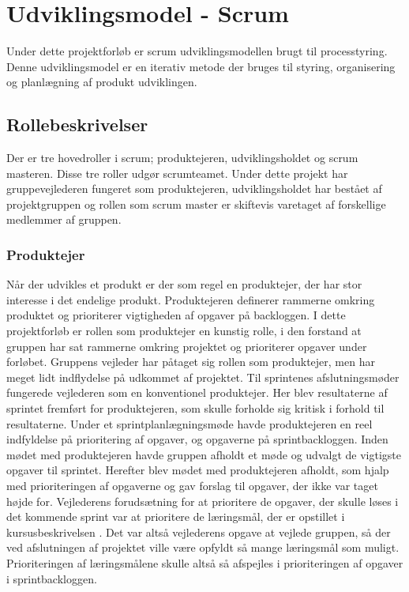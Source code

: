 \chapter{Udviklingsmodel - Scrum}
Under dette projektforløb er scrum udviklingsmodellen brugt til processtyring. Denne udviklingsmodel er en iterativ metode der bruges til styring, organisering og planlægning af produkt udviklingen.


\section{Rollebeskrivelser}
Der er tre hovedroller i scrum; produktejeren, udviklingsholdet og scrum masteren. Disse tre roller udgør scrumteamet. Under dette projekt har gruppevejlederen fungeret som produktejeren, udviklingsholdet har bestået af projektgruppen og rollen som scrum master er skiftevis varetaget af forskellige medlemmer af gruppen.

\subsection{Produktejer}
Når der udvikles et produkt er der som regel en produktejer, der har stor interesse i det endelige produkt. Produktejeren definerer rammerne omkring produktet og prioriterer vigtigheden af opgaver på backloggen. \newline\noindent
I dette projektforløb er rollen som produktejer en kunstig rolle, i den forstand at gruppen har sat rammerne omkring projektet og prioriterer opgaver under forløbet. Gruppens vejleder har påtaget sig rollen som produktejer, men har meget lidt indflydelse på udkommet af projektet. Til sprintenes afslutningsmøder fungerede vejlederen som en konventionel produktejer. Her blev resultaterne af sprintet fremført for produktejeren, som skulle forholde sig kritisk i forhold til resultaterne.\newline\noindent
Under et sprintplanlægningsmøde havde produktejeren en reel indfyldelse på prioritering af opgaver, og opgaverne på sprintbackloggen. Inden mødet med produktejeren havde gruppen afholdt et møde og udvalgt de vigtigste opgaver til sprintet. Herefter blev mødet med produktejeren afholdt, som hjalp med prioriteringen af opgaverne og gav forslag til opgaver, der ikke var taget højde for.  \newline\noindent
Vejlederens forudsætning for at prioritere de opgaver, der skulle løses i det kommende sprint var at prioritere de læringsmål, der er opstillet i kursusbeskrivelsen \cite{laeringsmaal}. Det var altså vejlederens opgave at vejlede gruppen, så der ved afslutningen af projektet ville være opfyldt så mange læringsmål som muligt. Prioriteringen af læringsmålene skulle altså så afspejles i prioriteringen af opgaver i sprintbackloggen. 


